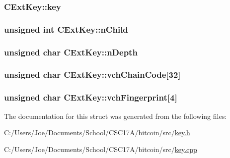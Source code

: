 \subsubsection[{key}]{ C\+Ext\+Key\+::key}\label{struct_c_ext_key_a93cd93ef3311d9dbcf475282a5f80fb2}
\hypertarget{struct_c_ext_key_ad15cb7ab68b59495eec71f6586803048}{}
\subsubsection[{n\+Child}]{\setlength{\rightskip}{0pt plus 5cm}unsigned int C\+Ext\+Key\+::n\+Child}\label{struct_c_ext_key_ad15cb7ab68b59495eec71f6586803048}
\hypertarget{struct_c_ext_key_ab197a253f41646975405b4ead8027b55}{}
\subsubsection[{n\+Depth}]{\setlength{\rightskip}{0pt plus 5cm}unsigned char C\+Ext\+Key\+::n\+Depth}\label{struct_c_ext_key_ab197a253f41646975405b4ead8027b55}
\hypertarget{struct_c_ext_key_a637ce75955e2883d20172b707c26a459}{}
\subsubsection[{vch\+Chain\+Code}]{\setlength{\rightskip}{0pt plus 5cm}unsigned char C\+Ext\+Key\+::vch\+Chain\+Code\mbox{[}32\mbox{]}}\label{struct_c_ext_key_a637ce75955e2883d20172b707c26a459}
\hypertarget{struct_c_ext_key_a22efb3f5dfb26cd8d88d2ab5db885978}{}
\subsubsection[{vch\+Fingerprint}]{\setlength{\rightskip}{0pt plus 5cm}unsigned char C\+Ext\+Key\+::vch\+Fingerprint\mbox{[}4\mbox{]}}\label{struct_c_ext_key_a22efb3f5dfb26cd8d88d2ab5db885978}


The documentation for this struct was generated from the following files\+:\begin{DoxyCompactItemize}
\item 
C\+:/\+Users/\+Joe/\+Documents/\+School/\+C\+S\+C17\+A/bitcoin/src/\hyperlink{key_8h}{key.\+h}\item 
C\+:/\+Users/\+Joe/\+Documents/\+School/\+C\+S\+C17\+A/bitcoin/src/\hyperlink{key_8cpp}{key.\+cpp}\end{DoxyCompactItemize}
